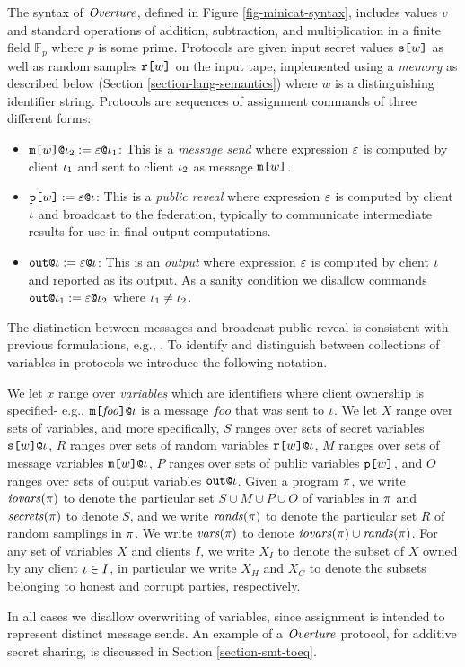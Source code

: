 The syntax of $\mathit{Overture}$, defined in Figure \ref{fig-minicat-syntax},
includes values $v$ and standard operations of addition, subtraction,
and multiplication in a finite field $\mathbb{F}_p$ where $p$ is some
prime.  Protocols are given input secret values $\texttt{s[}w\texttt{]}$ as well
as random samples $\texttt{r[}w\texttt{]}$ on the input tape, implemented using a
\emph{memory} as described below (Section
\ref{section-lang-semantics}) where $w$ is a distinguishing 
identifier string. Protocols are sequences of assignment commands of three
different forms:
\begin{itemize}
\item $\texttt{m[}w\texttt{]}\texttt{@}\iota_2 := \varepsilon\texttt{@}\iota_1$: This
  is a \emph{message send} where expression $\varepsilon$ is computed
  by client $\iota_1$ and sent to client $\iota_2$ as message
  $\texttt{m[}w\texttt{]}$.
\item $\texttt{p[}w\texttt{]} := \varepsilon\texttt{@}\iota$: This
  is a \emph{public reveal} where expression $\varepsilon$ is computed
  by client $\iota$ and broadcast to the federation, typically
  to communicate intermediate results for use in final output
  computations.
\item $\texttt{out}\texttt{@}\iota := \varepsilon\texttt{@}\iota$: This
  is an \emph{output} where expression $\varepsilon$ is computed
  by client $\iota$ and reported as its output. As a
  sanity condition we disallow commands
  $\texttt{out}\texttt{@}\iota_1 := \varepsilon\texttt{@}\iota_2$ where $\iota_1\ne\iota_2$.
\end{itemize}
The distinction between
messages and broadcast public reveal is consistent with previous
formulations, e.g., \cite{6266151}. To identify and distinguish
between collections of variables in protocols we introduce the
following notation.
\begin{definition}
We let $x$ range over \emph{variables} which are identifiers where
client ownership is specified- e.g.,
$\texttt{m[}\mathit{foo}\texttt{]}\texttt{@}\iota$ is a message $\mathit{foo}$ that
was sent to $\iota$. We let $X$ range over sets of variables, and more
specifically, $S$ ranges over sets of secret variables
$\texttt{s[}w\texttt{]}\texttt{@}\iota$, $R$ ranges over sets of random variables
$\texttt{r[}w\texttt{]}\texttt{@}\iota$, $M$ ranges over sets of message variables
$\texttt{m[}w\texttt{]}\texttt{@}\iota$, $P$ ranges over sets of public variables
$\texttt{p[}w\texttt{]}$, and $O$ ranges over sets of output variables $\texttt{out}\texttt{@}\iota$.
Given a program $\pi$, we write $\mathit{iovars}(\pi)$ to denote the
particular set $S \cup M \cup P \cup O$ of variables in $\pi$ and
$\mathit{secrets}(\pi)$ to denote $S$, and we write $\mathit{rands}(\pi)$ to
denote the particular set $R$ of random samplings in $\pi$. We write
$\mathit{vars}(\pi)$ to denote $\mathit{iovars}(\pi) \cup \mathit{rands}(\pi)$. For any set
of variables $X$ and clients $I$, we write $X_I$ to denote the subset
of $X$ owned by any client $\iota \in I$, in particular we write $X_H$
and $X_C$ to denote the subsets belonging to honest and corrupt
parties, respectively.
\end{definition}
In all cases we disallow overwriting of variables, since assignment is
intended to represent distinct message sends. An example of a
$\mathit{Overture}$ protocol, for additive secret sharing, is discussed in
Section \ref{section-smt-toeq}.

